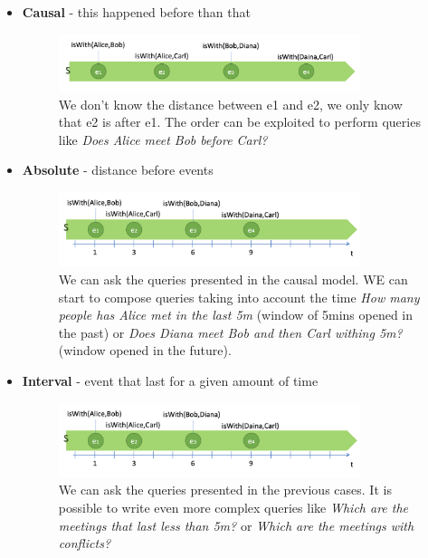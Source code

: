 \documentclass[10pt,a4paper]{article}
\begin{document}
\begin{itemize}
	\item \textbf{Causal} - this happened before than that
	\begin{figure}[ht!]
 \hfill \includegraphics[width=250pt]{images/causal-time.png}\hspace*{\fill}
 \caption{We don't know the distance between e1 and e2, we only know that e2 is after e1. The order can be exploited to perform queries like \textit{Does Alice meet Bob before Carl?}}
\end{figure} 
	\item \textbf{Absolute} - distance before events
		\begin{figure}[ht!]
 \hfill \includegraphics[width=250pt]{images/absolute-time.png}\hspace*{\fill}
 \caption{We can ask the queries presented in the causal model. WE can start to compose queries taking into account the time \textit{How many people has Alice met in the last 5m} (window of 5mins opened in the past) or \textit{Does Diana meet Bob and then Carl withing 5m?} (window opened in the future).}
 \end{figure} 
	\item \textbf{Interval} - event that last for a given amount of time
	\begin{figure}[ht!]
 \hfill \includegraphics[width=250pt]{images/absolute-time.png}\hspace*{\fill}
 \caption{We can ask the queries presented in the previous cases. It is possible to write even more complex queries like \textit{Which are the meetings that last less than 5m?} or \textit{Which are the meetings with conflicts?}}
 \end{figure} 
\end{itemize}
\end{document}
